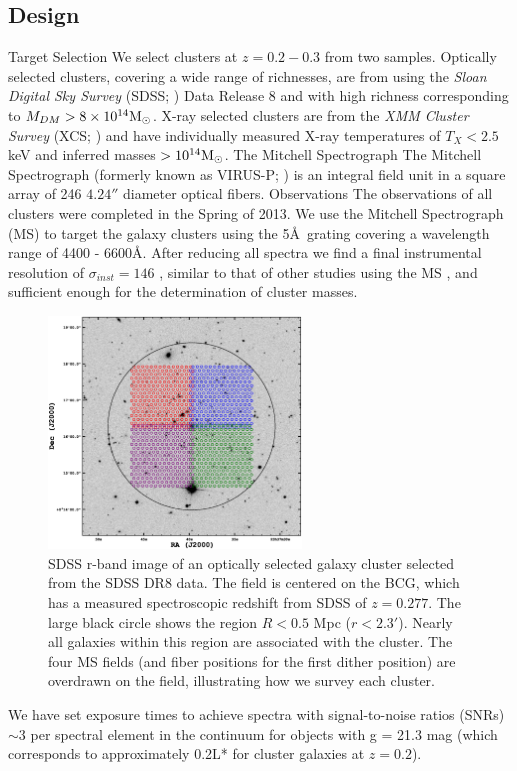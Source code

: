 \documentclass[12pt]{article}
\begin{document}
\subsection{Design}
\begin{outline}[enumerate]
	\1 Target Selection
			\2 We select clusters at $z=0.2-0.3$ from two samples. Optically selected clusters, covering a wide range of richnesses, are from \cite{Rykoff2012} using the \textit{Sloan Digital Sky Survey} (SDSS; \citealt{Blanton2001a}) Data Release 8 and with high richness corresponding to $M_{DM} > 8\times10^{14}\hbox{$\mathrm{M}_\odot$}$. X-ray selected clusters are from the \textit{XMM Cluster Survey} (XCS; \citealt{Mehrtens2012}) and have individually measured X-ray temperatures of $T_X < 2.5$keV and inferred masses $> 10^{14}\hbox{$\mathrm{M}_\odot$}$.
	\1 The Mitchell Spectrograph
			\2 The Mitchell Spectrograph (formerly known as VIRUS-P; \citealt{Hill2008a}) is an integral field unit in a square array of 246 $4.24''$ diameter optical fibers.
	\1 Observations
		\2 The observations of all clusters were completed in the Spring of 2013.
		\2 We use the Mitchell Spectrograph (MS) to target the galaxy clusters using the 5\AA\ grating covering a wavelength range of 4400 - 6600\AA. After reducing all spectra we find a final instrumental resolution of $\sigma_{inst} = 146$ \kms, similar to that of other studies using the MS , and sufficient enough for the determination of cluster masses.
		\begin{figure}
			\includegraphics[width=0.6\textwidth]{./figures/pointings.eps} 
			\caption{SDSS r-band image of an optically selected galaxy cluster selected from the SDSS DR8 data. The field is centered on the BCG, which has a measured spectroscopic redshift from SDSS of $z = 0.277$. The large black circle shows the region $R<0.5$ Mpc ($r<2.3'$). Nearly all galaxies within this region are associated with the cluster. The four MS fields (and fiber positions for the first dither position) are overdrawn on the field, illustrating how we survey each cluster.}
			\label{fig:pointings} 
		\end{figure}
		
		\3 We have set exposure times to achieve spectra with signal-to-noise ratios (SNRs) $\sim3$ per spectral element in the continuum for objects with g = 21.3 mag (which corresponds to approximately 0.2L* for cluster galaxies at $z = 0.2$).
\end{outline}
\end{document}

